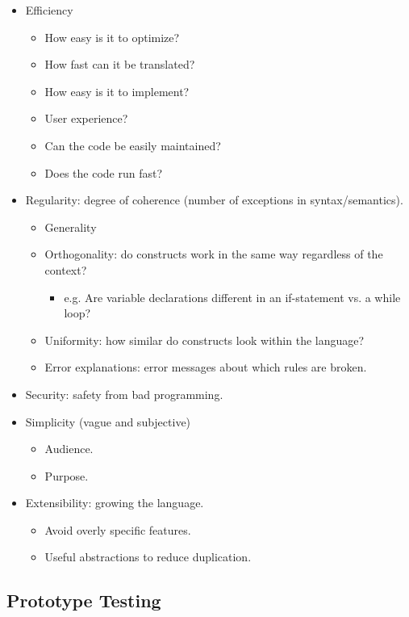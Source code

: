 \documentclass{article}
\begin{document}
\begin{itemize}
    \item Efficiency
    \begin{itemize}
        \item How easy is it to optimize?
        \item How fast can it be translated?
        \item How easy is it to implement?
        \item User experience?
        \item Can the code be easily maintained?
        \item Does the code run fast?
    \end{itemize}
    \item Regularity: degree of coherence (number of exceptions in syntax/semantics).
    \begin{itemize}
        \item Generality
        \item Orthogonality: do constructs work in the same way regardless of the context?
        \begin{itemize}
            \item e.g. Are variable declarations different in an if-statement vs. a while loop?
        \end{itemize}
        \item Uniformity: how similar do constructs look within the language?
        \item Error explanations: error messages about which rules are broken.
    \end{itemize}
    \item Security: safety from bad programming.
    \item Simplicity (vague and subjective)
    \begin{itemize}
        \item Audience.
        \item Purpose.
    \end{itemize}
    \item Extensibility: growing the language.
    \begin{itemize}
        \item Avoid overly specific features.
        \item Useful abstractions to reduce duplication.
    \end{itemize}
\end{itemize}

\subsection{Prototype Testing}
\end{document}

